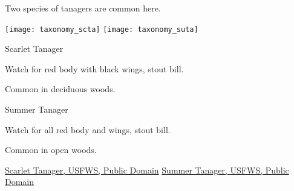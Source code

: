 \documentclass[t]{beamer}
\newcommand{\backoneline}{\vspace{-\baselineskip}}
\begin{document}
\begin{frame}{Two species of tanagers are common here.}
	
		\texttt{[image: taxonomy\_scta]}\hfill
		\texttt{[image: taxonomy\_suta]}
	
		\backoneline
		
		\begin{multicols}{2}
				Scarlet Tanager
				
				\medskip
				
				Watch for red body with black wings, stout bill.
				
				\smallskip
				
				Common in deciduous woods.
				
				
				\columnbreak
				
				Summer Tanager
				
				\medskip
				
				Watch for all red body and wings, stout bill.
				
				\smallskip
				
				Common in open woods.
				
			\end{multicols}	
		
		\vfilll
		
		\tiny
		
		\href{https://flickr.com/photos/usfwsnortheast/50109221467}{Scarlet Tanager, USFWS, Public Domain} \hfill 
		\href{https://flickr.com/photos/usfwsnortheast/51177620670}{Summer Tanager, USFWS, Public Domain}
	
\end{frame}

%
%
%
%
%
%	
%		
%		
%		
%		


%
\end{document}
